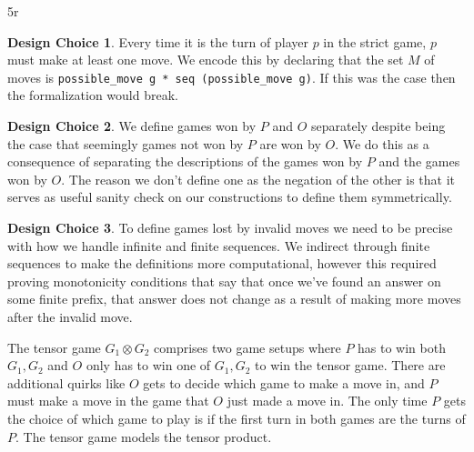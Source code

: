 5r\documentclass{article}
\theoremstyle{definition}
\newtheorem*{designchoice}{Design Choice}
\begin{document}
\begin{designchoice}
Every time it is the turn of player $p$ in the strict game, $p$ must make at least one move. We encode this by declaring that the set $M$ of moves is \verb|possible_move g * seq (possible_move g)|. If this was the case then the formalization would break. 
\end{designchoice}

\begin{designchoice}
We define games won by $P$ and $O$ separately despite being the case that seemingly games not won by $P$ are won by $O$. We do this as a consequence of separating the descriptions of the games won by $P$ and the games won by $O$. The reason we don't define one as the negation of the other is that it serves as useful sanity check on our constructions to define them symmetrically. 
\end{designchoice}

\begin{designchoice}
To define games lost by invalid moves we need to be precise with how we handle infinite and finite sequences. We  indirect through finite sequences to make the definitions more computational, however this required proving monotonicity conditions that say that once we've found an answer on some finite prefix, that answer does not change as a result of making more moves after the invalid move.  
\end{designchoice}

The tensor game $G_1 \otimes G_2$ comprises two game setups where $P$ has to win both $G_1, G_2$ and $O$ only has to win one of $G_1, G_2$ to win the tensor game. There are additional quirks like $O$ gets to decide which game to make a move in, and $P$ must make a move in the game that $O$ just made a move in. The only time $P$ gets the choice of which game to play is if the first turn in both games are the turns of $P$. The tensor game models the tensor product. 
\\
\end{document}

